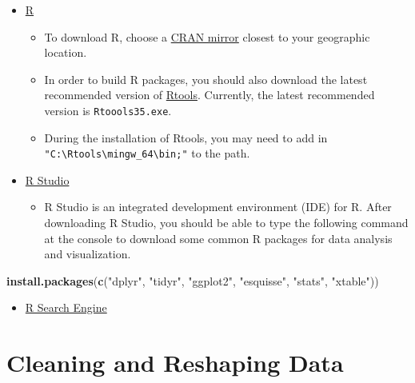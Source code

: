 \documentclass[]{book}
\newenvironment{Shaded}{\begin{snugshade}}{\end{snugshade}}
\newcommand{\KeywordTok}[1]{\textcolor[rgb]{0.13,0.29,0.53}{\textbf{#1}}}
\newcommand{\NormalTok}[1]{#1}
\newcommand{\StringTok}[1]{\textcolor[rgb]{0.31,0.60,0.02}{#1}}
\providecommand{\tightlist}{%
  \setlength{\itemsep}{0pt}\setlength{\parskip}{0pt}}
\begin{document}
\begin{itemize}
\item
  \href{https://www.r-project.org/}{R}

  \begin{itemize}
  \tightlist
  \item
    To download R, choose a \href{https://cran.r-project.org/mirrors.html}{CRAN mirror} closest to your geographic location.
  \item
    In order to build R packages, you should also download the latest recommended version of \href{https://cran.r-project.org/bin/windows/Rtools/}{Rtools}. Currently, the latest recommended version is \texttt{Rtoools35.exe}.
  \item
    During the installation of Rtools, you may need to add in \texttt{"C:\textbackslash{}Rtools\textbackslash{}mingw\_64\textbackslash{}bin;"} to the path.
  \end{itemize}
\item
  \href{https://www.rstudio.com/products/rstudio/download/\#download}{R Studio}

  \begin{itemize}
  \tightlist
  \item
    R Studio is an integrated development environment (IDE) for R. After downloading R Studio, you should be able to type the following command at the console to download some common R packages for data analysis and visualization.
  \end{itemize}
\end{itemize}

\begin{Shaded}
\begin{Highlighting}[]
\KeywordTok{install.packages}\NormalTok{(}\KeywordTok{c}\NormalTok{(}\StringTok{"dplyr"}\NormalTok{, }\StringTok{"tidyr"}\NormalTok{, }\StringTok{"ggplot2"}\NormalTok{, }\StringTok{"esquisse"}\NormalTok{, }\StringTok{"stats"}\NormalTok{, }\StringTok{"xtable"}\NormalTok{))}
\end{Highlighting}
\end{Shaded}

\begin{itemize}
\tightlist
\item
  \href{https://rseek.org/}{R Search Engine}
\end{itemize}

\hypertarget{cleaning-and-reshaping-data}{%
\section{Cleaning and Reshaping Data}\label{cleaning-and-reshaping-data}}
\end{document}
